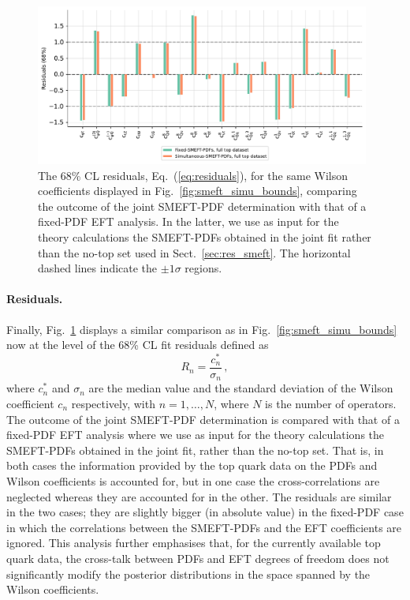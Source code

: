 \documentclass[withindex,glossary]{cam-thesis}
\begin{document}
\begin{figure}[t]
\centering
\includegraphics[width=0.98\textwidth]{smeft_plots/fixedsmeftpdf_res.pdf}
\caption{The 68\% CL residuals, Eq.~(\ref{eq:residuals}), for the
  same Wilson coefficients displayed in Fig.~\ref{fig:smeft_simu_bounds},
  comparing the outcome of the joint SMEFT-PDF determination
  with that of a fixed-PDF EFT analysis.
  In the latter, we use as input for the theory calculations
  the  SMEFT-PDFs obtained in the joint fit rather than the
  no-top set
  used in Sect.~\ref{sec:res_smeft}.
  The horizontal dashed lines indicate the $\pm 1\sigma$ regions.
}
\label{fig:fixedsmeftpdf_res}
\end{figure}

\paragraph{Residuals.} Finally, Fig.~\ref{fig:fixedsmeftpdf_res} displays a similar comparison as
in Fig.~\ref{fig:smeft_simu_bounds} now at the level of the 68\% CL fit residuals defined as
\begin{equation}
  \label{eq:residuals}
R_n = \frac{c_n^*}{\sigma_n} \, ,
\end{equation}
where $c_n^*$ and $\sigma_n$ are the median value and the standard deviation of the Wilson coefficient
$c_n$ respectively, with $n=1,\ldots,N$, where $N$ is the number of operators.
%
The outcome of the joint SMEFT-PDF determination
is compared with that of a fixed-PDF EFT analysis
where we use as input for the theory calculations
the  SMEFT-PDFs obtained in the joint fit, rather than the no-top set.
%
That is, in both cases the information provided by the top quark data on the PDFs
and Wilson coefficients is accounted for, but in one case the cross-correlations
are neglected whereas they are accounted for in the other.
%
The residuals are similar in the two cases; they are slightly bigger (in absolute value)
in the fixed-PDF case in which the correlations between the SMEFT-PDFs and the EFT
coefficients are ignored.
%
This analysis further emphasises that, for the currently available top quark data, the cross-talk
between PDFs and EFT degrees of freedom does not significantly modify the posterior
distributions in the space spanned by the Wilson coefficients.\\
\end{document}
